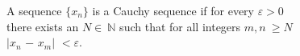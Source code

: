 \documentclass[preview]{standalone}
\begin{document}
\begin{center}
A sequence $\{x_n\}$ is a Cauchy sequence if for every $\varepsilon > 0$\\there exists an $N$$\in\:$$\mathbb{N}$ such that for all integers $m, n\:$$ \geq$$N$\\$|$$x_n$ $-$ $x_m$$|$ $<\varepsilon$.
\end{center}
\end{document}
